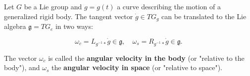 Let $G$ be a Lie group and $g = g(t)$ a curve describing the motion of a generalized rigid body. The tangent vector $\dot{g} \in TG_g$ can be translated to the Lie algebra $\mathfrak{g} = TG_e$ in two ways:

$$\omega_c = L_{g^{-1}*} \dot{g} \in \mathfrak{g}, \quad \omega_s = R_{g^{-1}*} \dot{g} \in \mathfrak{g}.$$

The vector $\omega_c$ is called the \textbf{angular velocity in the body} (or "relative to the body"), and $\omega_s$ the \textbf{angular velocity in space} (or "relative to space").

